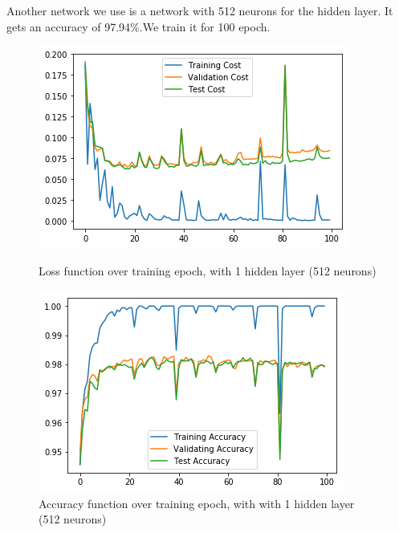 \documentclass{article}
\begin{document}
\subsubsection{}
Another network we use is a network with 512 neurons for the hidden layer. It gets an accuracy of 97.94\%.We train it for 100 epoch.
\begin{figure}[h]
	\begin{minipage}{0.48\textwidth}
		\centering
		\includegraphics[width=\textwidth]{pics/loss_512.png}
		\caption{Loss function over training epoch,  with 1 hidden layer (512 neurons)}
	\end{minipage}\hfill
	\begin{minipage}{0.48\textwidth}
		\centering
		\includegraphics[width=\textwidth]{pics/acc_512.png}
		\caption{Accuracy function over training epoch, with with 1 hidden layer (512 neurons)}
	\end{minipage}
\end{figure}
\end{document}
